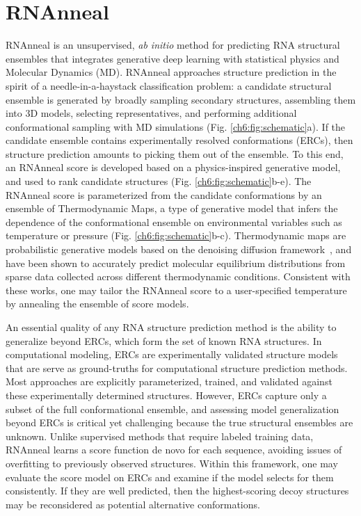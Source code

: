 \section{RNAnneal}
RNAnneal is an unsupervised, {\it ab initio} method for predicting RNA structural ensembles that integrates generative deep learning with statistical physics and Molecular Dynamics (MD). RNAnneal approaches structure prediction in the spirit of a needle-in-a-haystack classification problem: a candidate structural ensemble is generated by broadly sampling secondary structures, assembling them into 3D models, selecting representatives, and performing additional conformational sampling with MD simulations (Fig. \ref{ch6:fig:schematic}a). If the candidate ensemble contains experimentally resolved conformations (ERCs), then structure prediction amounts to picking them out of the ensemble. To this end, an RNAnneal score is developed based on a physics-inspired generative model, and used to rank candidate structures (Fig. \ref{ch6:fig:schematic}b-e). The RNAnneal score is parameterized from the candidate conformations by an ensemble of Thermodynamic Maps, a type of generative model that infers the dependence of the conformational ensemble on environmental variables such as temperature or pressure (Fig. \ref{ch6:fig:schematic}b-c). Thermodynamic maps are probabilistic generative models based on the denoising diffusion framework~\cite{nonequilibrium-learning}, and have been shown to accurately predict molecular equilibrium distributions from sparse data collected across different thermodynamic conditions. \cite{herron2024inferring,exptm,beyerle2025inferring} Consistent with these works, one may tailor the RNAnneal score to a user-specified temperature by annealing the ensemble of score models.

An essential quality of any RNA structure prediction method is the ability to generalize beyond ERCs, which form the set of known RNA structures. In computational modeling, ERCs are experimentally validated structure models that are serve as ground-truths for computational structure prediction methods. Most approaches are explicitly parameterized, trained, and validated against these experimentally determined structures. However, ERCs capture only a subset of the full conformational ensemble, and assessing model generalization beyond ERCs is critical yet challenging because the true structural ensembles are unknown. Unlike supervised methods that require labeled training data, RNAnneal learns a score function de novo for each sequence, avoiding issues of overfitting to previously observed structures. Within this framework, one may evaluate the score model on ERCs and examine if the model selects for them consistently. If they are well predicted, then the highest-scoring decoy structures may be reconsidered as potential alternative conformations.

